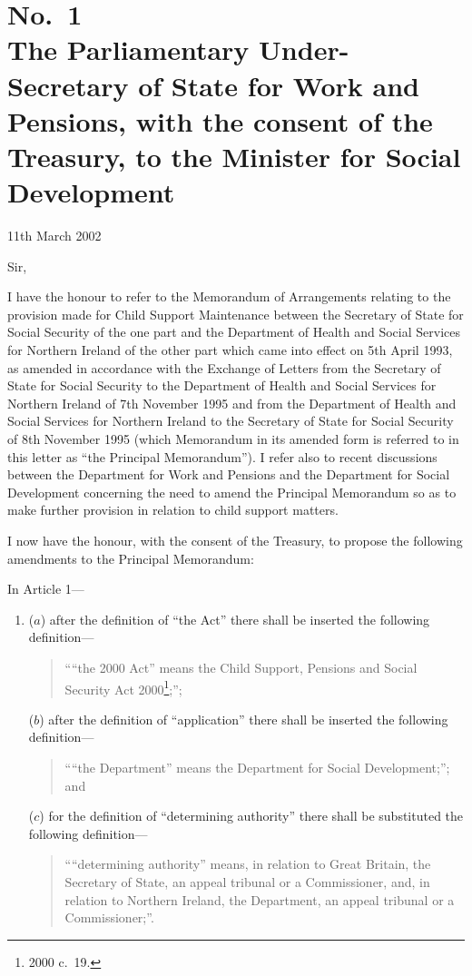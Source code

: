 \documentclass[12pt,a4paper]{article}
\begin{document}
\renewcommand\parthead{--- Schedule 1B}


\section*{No.\ 1\\The Parliamentary Under-Secretary of State for Work and Pensions, with the consent of the Treasury, to the Minister for Social Development}

11th March 2002

Sir,

I have the honour to refer to the Memorandum of Arrangements relating to the provision made for Child Support Maintenance between the Secretary of State for Social Security of the one part and the Department of Health and Social Services for Northern Ireland of the other part which came into effect on 5th April 1993, as amended in accordance with the Exchange of Letters from the Secretary of State for Social Security to the Department of Health and Social Services for Northern Ireland of 7th November 1995 and from the Department of Health and Social Services for Northern Ireland to the Secretary of State for Social Security of 8th November 1995 (which Memorandum in its amended form is referred to in this letter as “the Principal Memorandum”). I refer also to recent discussions between the Department for Work and Pensions and the Department for Social Development concerning the need to amend the Principal Memorandum so as to make further provision in relation to child support matters.

I now have the honour, with the consent of the Treasury, to propose the following amendments to the Principal Memorandum:

In Article 1—
\begin{enumerate}\item[]
($a$) after the definition of “the Act” there shall be inserted the following definition—
\begin{quotation}
““the 2000 Act” means the Child Support, Pensions and Social Security Act 2000\footnote{2000 c.\ 19.};”;
\end{quotation}

($b$) after the definition of “application” there shall be inserted the following definition—
\begin{quotation}
““the Department” means the Department for Social Development;”; and
\end{quotation}

($c$) for the definition of “determining authority” there shall be substituted the following definition—
\begin{quotation}
    ““determining authority” means, in relation to Great Britain, the Secretary of State, an appeal tribunal or a Commissioner, and, in relation to Northern Ireland, the Department, an appeal tribunal or a Commissioner;”. 
\end{quotation}
\end{enumerate}
\end{document}
